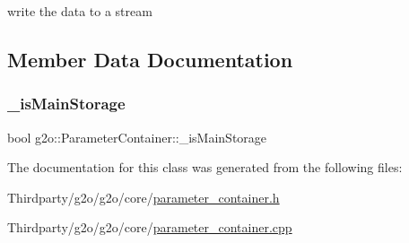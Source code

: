 write the data to a stream 



\subsection{Member Data Documentation}
\mbox{\label{classg2o_1_1_parameter_container_a2ff1e92bc6a486d48043e2191807bd47}} 
\subsubsection{\texorpdfstring{\+\_\+is\+Main\+Storage}{\_isMainStorage}}
{\footnotesize\ttfamily bool g2o\+::\+Parameter\+Container\+::\+\_\+is\+Main\+Storage\hspace{0.3cm}{\ttfamily [protected]}}



The documentation for this class was generated from the following files\+:\begin{DoxyCompactItemize}
\item 
Thirdparty/g2o/g2o/core/\mbox{\hyperlink{parameter__container_8h}{parameter\+\_\+container.\+h}}\item 
Thirdparty/g2o/g2o/core/\mbox{\hyperlink{parameter__container_8cpp}{parameter\+\_\+container.\+cpp}}\end{DoxyCompactItemize}
